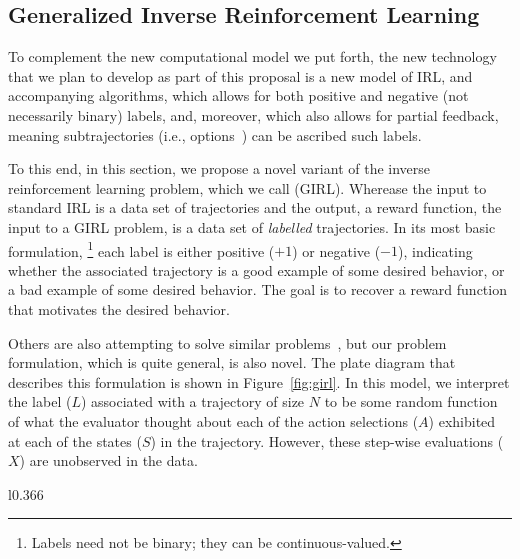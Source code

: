 
\subsection{Generalized Inverse Reinforcement Learning}
\label{sec:girl}

To complement the new computational model we put forth, the new
technology that we plan to develop as part of this proposal is a new
model of IRL, and accompanying algorithms, which allows for both
positive and negative (not necessarily binary) labels, and, moreover,
which also allows for partial feedback, meaning subtrajectories (i.e.,
options~\cite{sutton99}) can be ascribed such labels.

To this end, in this section, we propose a novel variant of the
inverse reinforcement learning problem, which we call
 (GIRL).  Wherease the input to standard IRL is
a data set of trajectories
and the output, a reward function, the input to a GIRL problem, is a
data set of \emph{labelled\/} trajectories. 
In its most basic formulation,%
\footnote{Labels need not be binary; they can be continuous-valued.}
each label is either positive ($+1$) or negative ($-1$), indicating
whether the associated trajectory is a good example of some desired
behavior, or a bad example of some desired behavior.  The goal is to
recover a reward function that motivates the desired behavior.

Others are also attempting to solve similar problems~\cite{burchfiel2016distance,shiarlis2016inverse}, 
but our problem formulation, which is quite general, is also novel.
%
The plate diagram that describes this formulation is shown
in Figure~\ref{fig:girl}.  In this model, we interpret the label ($L$)
associated with a trajectory of size $N$ to be some random function of
what the evaluator thought about each of the action selections ($A$)
exhibited at each of the states ($S$) in the trajectory.  However,
these step-wise evaluations ($X$) are unobserved in the data.

\begin{wrapfigure}{l}{0.366\textwidth}
\caption{Generalized IRL}
\label{fig:girl}
\end{wrapfigure}

